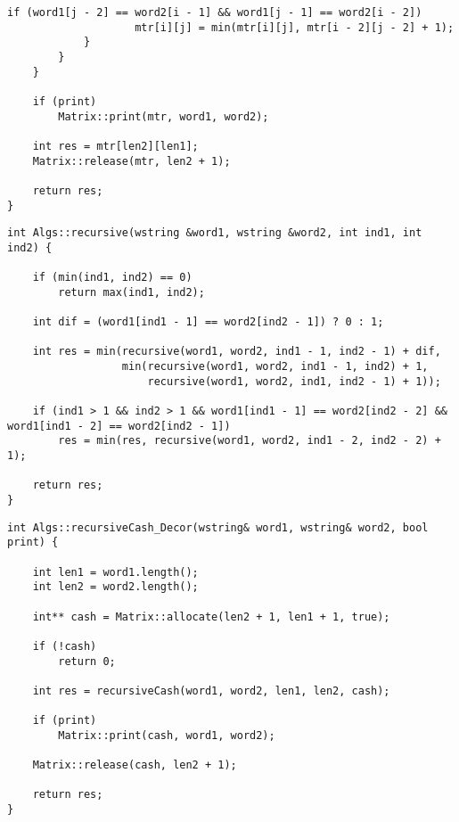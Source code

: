 \begin{lstlisting}[label=lst:dameray_lev_rec,caption=Функция нахождения расстояния Дамерау~---~Левенштейна с использованием матрицы (конец)]
                if (word1[j - 2] == word2[i - 1] && word1[j - 1] == word2[i - 2]) 
                    mtr[i][j] = min(mtr[i][j], mtr[i - 2][j - 2] + 1);
            }
        }
    }

    if (print)  
        Matrix::print(mtr, word1, word2);

    int res = mtr[len2][len1];
    Matrix::release(mtr, len2 + 1);

    return res;
}
\end{lstlisting}

\clearpage

\begin{lstlisting}[label=lst:dameray_lev_mtr,caption=Функция нахождения расстояния Дамерау~---~Левенштейна рекурсивно]
int Algs::recursive(wstring &word1, wstring &word2, int ind1, int ind2) {

    if (min(ind1, ind2) == 0)
        return max(ind1, ind2);

    int dif = (word1[ind1 - 1] == word2[ind2 - 1]) ? 0 : 1;

    int res = min(recursive(word1, word2, ind1 - 1, ind2 - 1) + dif,
                  min(recursive(word1, word2, ind1 - 1, ind2) + 1, 
                      recursive(word1, word2, ind1, ind2 - 1) + 1));

    if (ind1 > 1 && ind2 > 1 && word1[ind1 - 1] == word2[ind2 - 2] && word1[ind1 - 2] == word2[ind2 - 1])
        res = min(res, recursive(word1, word2, ind1 - 2, ind2 - 2) + 1);

    return res;
}
\end{lstlisting}

\clearpage

\begin{lstlisting}[label=lst:dameray_lev_rec_hash,caption=Функция вызова рекурсивного алгоритма c кешированием для поиска расстояния Дамерау~---~Левенштейна]
int Algs::recursiveCash_Decor(wstring& word1, wstring& word2, bool print) {

    int len1 = word1.length();
    int len2 = word2.length();

    int** cash = Matrix::allocate(len2 + 1, len1 + 1, true);

    if (!cash)
        return 0;

    int res = recursiveCash(word1, word2, len1, len2, cash);

    if (print)  
        Matrix::print(cash, word1, word2);

    Matrix::release(cash, len2 + 1);

    return res;
}
\end{lstlisting}

